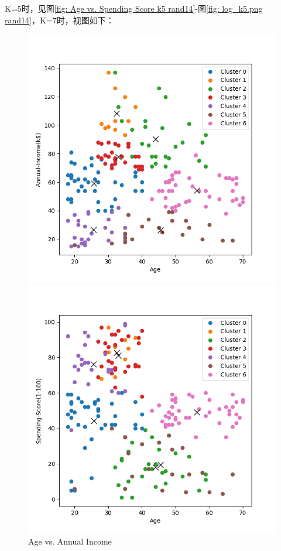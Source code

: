 \documentclass[8pt]{article}
\begin{document}
K=5时，见图\ref{fig: Age vs. Spending Score k5 rand14}-图\ref{fig: log_k5.png rand14}，K=7时，视图如下：
\begin{figure}[H]
    \centering
    \begin{minipage}{0.32\textwidth}
        \centering
        \includegraphics[width=\textwidth]{./Prob4/out/task1_rand14/images/cluster_result_k7_0_1.png}
        \caption{Age vs. Annual Income}
        \label{fig: Age vs. Annual Income k7}
    \end{minipage}
    \hfill
    \begin{minipage}{0.32\textwidth}
        \centering
        \includegraphics[width=\textwidth]{./Prob4/out/task1_rand14/images/cluster_result_k7_0_2.png}

\end{minipage}
\end{figure}
\end{document}
